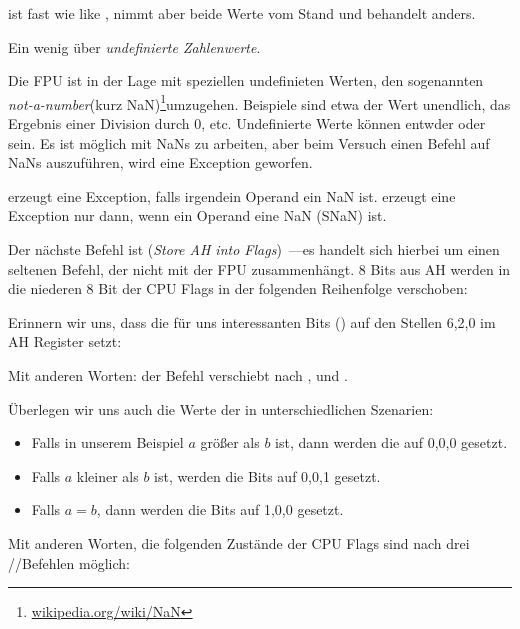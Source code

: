 


\FUCOMPP{} ist fast wie like \FCOM, nimmt aber beide Werte vom Stand und
behandelt  anders.


Ein wenig über \emph{undefinierte Zahlenwerte}.

\newcommand{\NANFN}{\footnote{\href{http://go.yurichev.com/17130}{wikipedia.org/wiki/NaN}}}
Die FPU ist in der Lage mit speziellen undefinieten Werten, den sogenannten
\emph{not-a-number}(kurz \gls{NaN})\NANFN umzugehen. Beispiele sind etwa der Wert
unendlich, das Ergebnis einer Division durch 0, etc. Undefinierte Werte können
entwder  oder  sein. Es ist möglich mit  NaNs zu
arbeiten, aber beim Versuch einen Befehl auf  NaNs auszuführen,
wird eine Exception geworfen. 

\FCOM erzeugt eine Exception, falls irgendein Operand ein \gls{NaN} ist.
\FUCOM erzeugt eine Exception nur dann, wenn ein Operand eine 
\gls{NaN} (SNaN) ist.

\label{SAHF}
Der nächste Befehl ist \SAHF (\emph{Store AH into Flags})~---es handelt sich
hierbei um einen seltenen Befehl, der nicht mit der FPU zusammenhängt.
8 Bits aus AH werden in die niederen 8 Bit der CPU Flags in der folgenden
Reihenfolge verschoben:



Erinnern wir uns, dass \FNSTSW die für uns interessanten Bits (\CThreeBits) auf
den Stellen 6,2,0 im AH Register setzt:


Mit anderen Worten: der Befehl  verschiebt \CThreeBits
nach \ZF, \PF und \CF. 

Überlegen wir uns auch die Werte der \CThreeBits in unterschiedlichen Szenarien:

\begin{itemize} 
  \item Falls in unserem Beispiel $a$ größer als $b$ ist, dann werden die
  \CThreeBits auf 0,0,0 gesetzt.
  \item Falls $a$ kleiner als $b$ ist, werden die Bits auf 0,0,1 gesetzt.
  \item Falls $a=b$, dann werden die Bits auf 1,0,0 gesetzt.
\end{itemize}
Mit anderen Worten, die folgenden Zustände der CPU Flags sind nach drei
\FUCOMPP/\FNSTSW/\SAHF Befehlen möglich:

